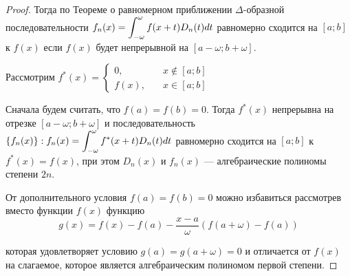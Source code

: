 \begin{proof}
    Тогда по Теореме о равномерном приближении $\Delta$-образной последовательности
    $f_n(x) = \displaystyle\int_{-\omega}^\omega f(x + t) D_n(t) dt$ равномерно сходится
    на $[a; b]$ к $f(x)$ если $f(x)$ будет непрерывной на $[a - \omega; b + \omega]$.

    Рассмотрим $f^*(x) = \begin{cases}
        0, \quad &x \not\in [a; b] \\
        f(x), \quad &x \in [a; b]
    \end{cases}$

    Сначала будем считать, что $f(a) = f(b) = 0$. Тогда $f^*(x)$ непрерывна на
    отрезке $[a - \omega; b + \omega]$ и последовательность $\{ f_n(x) \} : 
    f_n(x) = \displaystyle\int_{-\omega}^\omega f^*(x + t) D_n(t) dt$ равномерно сходится
    на $[a; b]$ к $f^*(x) = f(x)$, при этом $D_n(x)$ и $f_n(x)$ --- 
    алгебраические полиномы степени $2n$.

    От дополнительного условия $f(a) = f(b) = 0$ можно избавиться рассмотрев
    вместо функции $f(x)$ функцию 
    \[ g(x) = f(x) - f(a) - \frac{x - a}{\omega} (f(a + \omega) - f(a)) \]

    которая удовлетворяет условию $g(a) = g(a + \omega) = 0$ и отличается от
    $f(x)$ на слагаемое, которое является алгебраическим полиномом 
    первой степени.
\end{proof}


